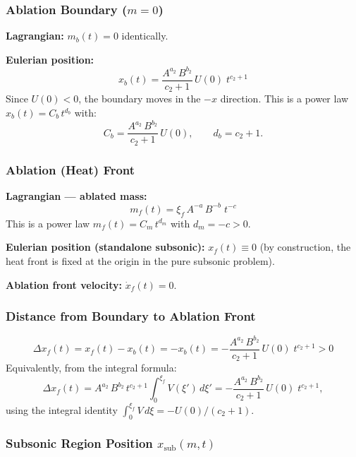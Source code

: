 \documentclass[11pt]{article}
\newcommand{\xsi}{\xi}
\newcommand{\xsif}{\xi_f}
\begin{document}
\subsubsection{Ablation Boundary ($m=0$)}

\textbf{Lagrangian:} $m_b(t) = 0$ identically.

\textbf{Eulerian position:}
\begin{equation}
  \boxed{x_b(t) = \frac{A^{a_2}\,B^{b_2}}{c_2+1}\,U(0)\;t^{c_2+1}}
\end{equation}
Since $U(0) < 0$, the boundary moves in the $-x$ direction. This is a power law $x_b(t) = C_b\,t^{d_b}$ with:
\begin{equation}
  C_b = \frac{A^{a_2}\,B^{b_2}}{c_2+1}\,U(0), \qquad d_b = c_2 + 1.
\end{equation}

\subsubsection{Ablation (Heat) Front}

\textbf{Lagrangian --- ablated mass:}
\begin{equation}
  \boxed{m_f(t) = \xsif\,A^{-a}\,B^{-b}\;t^{-c}}
  \label{eq:mf}
\end{equation}
This is a power law $m_f(t) = C_m\,t^{d_m}$ with $d_m = -c > 0$.

\textbf{Eulerian position (standalone subsonic):} $x_f(t) \equiv 0$ (by construction, the heat front is fixed at the origin in the pure subsonic problem).

\textbf{Ablation front velocity:} $\dot{x}_f(t) = 0$.

\subsubsection{Distance from Boundary to Ablation Front}

\begin{equation}
  \boxed{\Delta x_f(t) = x_f(t) - x_b(t) = -x_b(t) = -\frac{A^{a_2}\,B^{b_2}}{c_2+1}\,U(0)\;t^{c_2+1} > 0}
\end{equation}
Equivalently, from the integral formula:
\begin{equation}
  \Delta x_f(t) = A^{a_2}\,B^{b_2}\,t^{c_2+1}\int_0^{\xsif} V(\xsi')\,d\xsi'
  = -\frac{A^{a_2}\,B^{b_2}}{c_2+1}\,U(0)\;t^{c_2+1},
\end{equation}
using the integral identity $\int_0^{\xsif} V\,d\xsi = -U(0)/(c_2+1)$.

\subsubsection{Subsonic Region Position $x_{\mathrm{sub}}(m,t)$}
\end{document}
